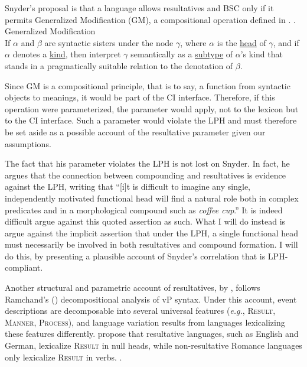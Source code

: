 \documentclass[MilwayThesis]{subfiles}
\begin{document}
Snyder's proposal is that a language allows resultatives and BSC only if it permits Generalized Modification (GM), a compositional operation defined in \Next.
\ex. Generalized Modification \parencite{snyder2012parameter}\\
If $\alpha$ and $\beta$ are syntactic sisters under the node $\gamma$, where $\alpha$ is the \uline{head} of $\gamma$, and if $\alpha$ denotes a \uline{kind}, then interpret $\gamma$ semantically as a \uline{subtype} of $\alpha$'s kind that stands in a pragmatically suitable relation to the denotation of $\beta$.

Since GM is a compositional principle, that is to say, a function from syntactic objects to meanings, it would be part of the CI interface.
Therefore, if this operation were parameterized, the parameter would apply, not to the lexicon but to the CI interface.
Such a parameter would violate the LPH and must therefore be set aside as a possible account of the resultative parameter given our assumptions.

The fact that his parameter violates the LPH is not lost on Snyder.
In fact, he argues that the connection between compounding and resultatives is evidence against the LPH, writing that ``[i]t is difficult to imagine any single, independently motivated functional head will find a natural role both in complex predicates and in a morphological compound such as \textit{coffee cup}.'' \parencite[62]{snyder1995language}
It is indeed difficult argue against this quoted assertion as such.
What I will do instead is argue against the implicit assertion that under the LPH, a single functional head must necessarily be involved in both resultatives and compound formation.
I will do this, by presenting a plausible account of Snyder's correlation that is LPH-compliant.

Another structural and parametric account of resultatives, by \textcite{son2008microparameters}, follows Ramchand's (\citeyear{ramchand2008verb}) decompositional analysis of vP syntax.
Under this account, event descriptions are decomposable into several universal features (\textit{e.g.}, \textsc{Result}, \textsc{Manner}, \textsc{Process}), and language variation results from languages lexicalizing these features differently.
\textcite{son2008microparameters} propose that resultative languages, such as English and German, lexicalize \textsc{Result} in null heads, while non-resultative Romance languages only lexicalize \textsc{Result} in verbs.
\ex.
\end{document}
